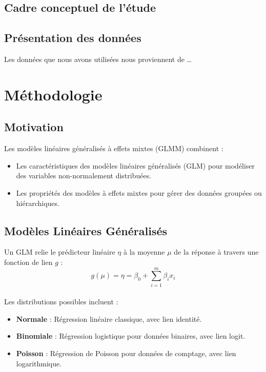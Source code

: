 \documentclass[
]{article}
\begin{document}
\hypertarget{cadre-conceptuel-de-luxe9tude}{%
\subsection{Cadre conceptuel de
l'étude}\label{cadre-conceptuel-de-luxe9tude}}

\hypertarget{pruxe9sentation-des-donnuxe9es}{%
\subsection{Présentation des
données}\label{pruxe9sentation-des-donnuxe9es}}

Les données que nous avons utilisées nous proviennent de \ldots{}

\hypertarget{muxe9thodologie}{%
\section{Méthodologie}\label{muxe9thodologie}}

\hypertarget{motivation}{%
\subsection{Motivation}\label{motivation}}

Les modèles linéaires généralisés à effets mixtes (GLMM) combinent :

\begin{itemize}
\item
  Les caractéristiques des modèles linéaires généralisés (GLM) pour
  modéliser des variables non-normalement distribuées.
\item
  Les propriétés des modèles à effets mixtes pour gérer des données
  groupées ou hiérarchiques.
\end{itemize}

\hypertarget{moduxe8les-linuxe9aires-guxe9nuxe9ralisuxe9s}{%
\subsection{Modèles Linéaires
Généralisés}\label{moduxe8les-linuxe9aires-guxe9nuxe9ralisuxe9s}}

Un GLM relie le prédicteur linéaire \(\eta\) à la moyenne \(\mu\) de la
réponse à travers une fonction de lien \(g\) :\\
\[ g(\mu) = \eta = \beta_0 + \sum_{i=1}^m \beta_i x_i \]\\
Les distributions possibles incluent :

\begin{itemize}
\item
  \textbf{Normale} : Régression linéaire classique, avec lien identité.
\item
  \textbf{Binomiale} : Régression logistique pour données binaires, avec
  lien logit.
\item
  \textbf{Poisson} : Régression de Poisson pour données de comptage,
  avec lien logarithmique.
\end{itemize}
\end{document}
